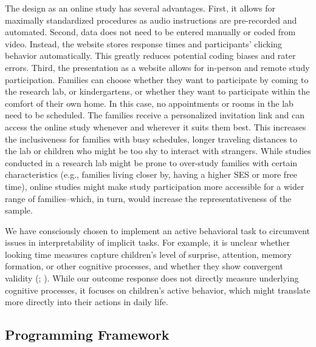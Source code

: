 \documentclass[
]{scrbook}
\begin{document}
The design as an online study has several advantages. First, it allows for maximally standardized procedures as audio instructions are pre-recorded and automated. Second, data does not need to be entered manually or coded from video. Instead, the website stores response times and participants' clicking behavior automatically. This greatly reduces potential coding biases and rater errors. Third, the presentation as a website allows for in-person and remote study participation. Families can choose whether they want to participate by coming to the research lab, or kindergartens, or whether they want to participate within the comfort of their own home. In this case, no appointments or rooms in the lab need to be scheduled. The families receive a personalized invitation link and can access the online study whenever and wherever it suits them best. This increases the inclusiveness for families with busy schedules, longer traveling distances to the lab or children who might be too shy to interact with strangers. While studies conducted in a research lab might be prone to over-study families with certain characteristics (e.g., families living closer by, having a higher SES or more free time), online studies might make study participation more accessible for a wider range of families\thinspace --\thinspace which, in turn, would increase the representativeness of the sample.

We have consciously chosen to implement an active behavioral task to circumvent issues in interpretability of implicit tasks. For example, it is unclear whether looking time measures capture children's level of surprise, attention, memory formation, or other cognitive processes, and whether they show convergent validity (; ). While our outcome response does not directly measure underlying cognitive processes, it focuses on children's active behavior, which might translate more directly into their actions in daily life.

\subsection{Programming Framework}\label{approach-programming}
\end{document}
